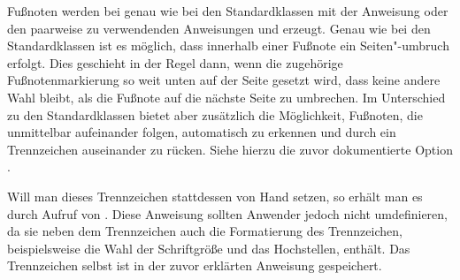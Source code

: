 \begin{Declaration}
\end{Declaration}%
Fußnoten werden bei {\KOMAScript} genau wie bei den Standardklassen mit der
Anweisung  oder den paarweise zu verwendenden Anweisungen
 und  erzeugt.  Genau wie bei den
Standardklassen ist es möglich, dass innerhalb einer Fußnote ein
Seiten"-umbruch erfolgt. Dies geschieht in der Regel dann, wenn die zugehörige
Fußnotenmarkierung so weit unten auf der Seite gesetzt wird, dass keine andere
Wahl bleibt, als die Fußnote auf die nächste Seite zu umbrechen. Im
Unterschied%
zu den Standardklassen bietet \KOMAScript{} aber zusätzlich die Möglichkeit,
Fußnoten, die unmittelbar aufeinander folgen, automatisch zu erkennen und
durch ein Trennzeichen auseinander zu
rücken. Siehe hierzu
die zuvor dokumentierte Option
.

Will man dieses Trennzeichen stattdessen von Hand setzen, so erhält man es
durch Aufruf von . Diese Anweisung sollten
Anwender jedoch nicht umdefinieren, da sie neben dem Trennzeichen auch die
Formatierung des Trennzeichen, beispielsweise die Wahl der Schriftgröße und
das Hochstellen, enthält. Das Trennzeichen selbst ist in der zuvor erklärten
Anweisung %
%
 gespeichert.

